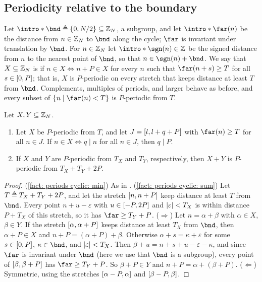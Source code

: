 \subsection{Periodicity relative to the boundary}
\AP Let $\intro*\bnd \defeq \set{0, N/2} \subseteq \inte_N$, a subgroup, and let $\intro*\far(n)$ be the distance from $n \in \mathbb{Z}_N$ to $\bnd$ along the cycle; $\far$ is invariant under translation by $\bnd$.
\AP For $n \in \mathbb{Z}_N$ let $\intro*\sgn(n) \in \inte$ be the signed distance from $n$ to the nearest point of $\bnd$, so that $n \in \sgn(n) + \bnd$.
We say that $X \subseteq \mathbb{Z}_N$ is  if $n \in X \Leftrightarrow n + P \in X$ for every $n$ such that $\far(n + s) \ge T$ for all $s \in [0, P]$; that is, $X$ is $P$-periodic on every stretch that keeps distance at least $T$ from $\bnd$.
Complements, multiples of periods, and larger  behave as before, and every subset of $\set{n \mid \far(n) < T}$ is $P$-periodic from $T$.
\begin{fact}\label{fact: periods cyclic}
    Let $X, Y \subseteq \mathbb{Z}_N$.
    \begin{enumerate}
        \item\label{fact: periods cyclic: min} Let $X$ be $P$-periodic from $T$, and let $J = [l, l + q + P]$ with $\far(n) \ge T$ for all $n \in J$. If $n \in X \Leftrightarrow q \mid n$ for all $n \in J$, then $q \mid P$.
        \item\label{fact: periods cyclic: sum} If $X$ and $Y$ are $P$-periodic from $T_X$ and $T_Y$, respectively, then $X + Y$ is $P$-periodic from $T_X + T_Y + 2P$.
    \end{enumerate}
\end{fact}
\begin{proof}
    (\ref{fact: periods cyclic: min}) As in .
    (\ref{fact: periods cyclic: sum})
    Let $T \defeq T_X + T_Y + 2P$, and let the stretch $[n, n + P]$ keep distance at least $T$ from $\bnd$.
    Every point $n + u - \varepsilon$ with $u \in [-P, 2P]$ and $\lvert\varepsilon\rvert < T_X$ is within distance $P + T_X$ of this stretch, so it has $\far \ge T_Y + P$.
    ($\Rightarrow$) Let $n = \alpha + \beta$ with $\alpha \in X$, $\beta \in Y$.
    If the stretch $[\alpha, \alpha + P]$ keeps distance at least $T_X$ from $\bnd$, then $\alpha + P \in X$ and $n + P = (\alpha + P) + \beta$.
    Otherwise $\alpha + s = \kappa + \varepsilon$ for some $s \in [0, P]$, $\kappa \in \bnd$, and $\lvert\varepsilon\rvert < T_X$.
    Then $\beta + u = n + s + u - \varepsilon - \kappa$, and since $\far$ is invariant under $\bnd$ (here we use that $\bnd$ is a subgroup), every point of $[\beta, \beta + P]$ has $\far \ge T_Y + P$.
    So $\beta + P \in Y$ and $n + P = \alpha + (\beta + P)$.
    ($\Leftarrow$) Symmetric, using the stretches $[\alpha - P, \alpha]$ and $[\beta - P, \beta]$.
\end{proof}

